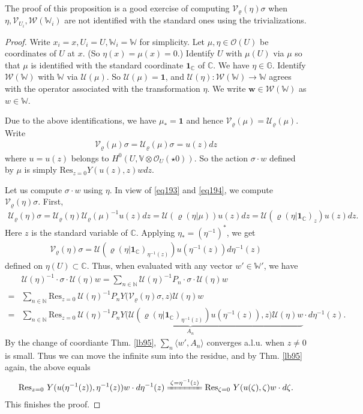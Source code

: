 \documentclass[12pt,a4paper,notitlepage]{article}
\theoremstyle{definition}
\theoremstyle{plain}
\newcommand{\mc}{\mathcal}
\newcommand{\id}{\mathbf{1}}
\newcommand{\Res}{\mathrm{Res}}
\newcommand{\bk}[1]{\langle {#1}\rangle}
\newcommand{\scr}{\mathscr}
\newcommand{\Vbb}{\mathbb V}
\newcommand{\Wbb}{\mathbb W}
\newcommand{\Gbb}{\mathbb G}
\newcommand{\Cbb}{\mathbb C}
\newcommand{\Nbb}{\mathbb N}
\newcommand{\wbf}{\mathbf w}
\numberwithin{equation}{section}
\begin{document}
The proof of this proposition is a good exercise of computing $\mc V_\varrho(\eta)\sigma$ when $\eta,\scr V_{U_i},\scr W(\Wbb_i)$ are not identified with the standard ones using the trivializations.

\begin{proof}
Write $x_i=x,U_i=U,\Wbb_i=\Wbb$ for simplicity. Let $\mu,\eta\in\scr O(U)$ be coordinates of $U$ at $x$. (So $\eta(x)=\mu(x)=0$.) Identify $U$ with $\mu(U)$ via $\mu$ so that $\mu$ is identified with the standard coordinate $\id_\Cbb$ of $\Cbb$. We have $\eta\in\Gbb$. Identify $\scr W(\Wbb)$ with $\Wbb$ via $\mc U(\mu)$. So $\mc U(\mu)=\id$, and $\mc U(\eta):\scr W(\Wbb)\rightarrow\Wbb$ agrees with the operator associated with the transformation $\eta$. We  write $\wbf\in\scr W(\Wbb)$ as $w\in\Wbb$.

Due to the above identifications, we have $\mu_*=\id$ and hence $\mc V_\varrho(\mu)=\mc U_\varrho(\mu)$. Write
\begin{align*}
\mc V_\varrho(\mu)\sigma=\mc U_\varrho(\mu)\sigma=u(z)dz
\end{align*}
where $u=u(z)$ belongs to $H^0(U,\Vbb\otimes\scr O_U(\star 0))$. So the action $\sigma\cdot w$ defined by $\mu$ is simply $\Res_{z=0}Y(u(z),z)wdz$.

Let us compute $\sigma\cdot w$ using $\eta$. In view of \eqref{eq193} and \eqref{eq194}, we compute $\mc V_\varrho(\eta)\sigma$. First,
\begin{align*}
\mc U_\varrho(\eta)\sigma=\mc U_\varrho(\eta)\mc U_\varrho(\mu)^{-1}u(z)dz=\mc U(\varrho(\eta|\mu))u(z)dz=\mc U(\varrho(\eta|\id_\Cbb)_z)u(z)dz.
\end{align*}
Here $z$ is the standard variable of $\Cbb$. Applying $\eta_*=(\eta^{-1})^*$, we get
\begin{align*}
\mc V_\varrho(\eta)\sigma=\mc U(\varrho(\eta|\id_\Cbb)_{\eta^{-1}(z)})u(\eta^{-1}(z))d{\eta^{-1}(z)}
\end{align*}
defined on $\eta(U)\subset\Cbb$. Thus, when evaluated with any vector  $w'\in\Wbb'$, we have
\begin{align*}
&\mc U(\eta)^{-1}\cdot \sigma\cdot \mc U(\eta)w=\sum_{n\in\Nbb}\mc U(\eta)^{-1}P_n\cdot \sigma\cdot \mc U(\eta)w\\
=&\sum_{n\in\Nbb}\Res_{z=0}~\mc U(\eta)^{-1}P_n Y\big(\mc V_\varrho(\eta)\sigma,z\big)\mc U(\eta) w\\
=&\sum_{n\in\Nbb}\Res_{z=0}~\underbrace {\mc U(\eta)^{-1}P_n Y\big(\mc U(\varrho(\eta|\id_\Cbb)_{\eta^{-1}(z)})u(\eta^{-1}(z)),z\big)\mc U(\eta) w}_{A_n}\cdot d{\eta^{-1}(z)}.
\end{align*}
By the change of coordiante Thm. \ref{lb95}, $\sum_n\bk{w',A_n}$ converges a.l.u. when $z\neq 0$ is small. Thus we can move the infinite sum into the residue, and by Thm. \ref{lb95} again, the above equals
\begin{align*}
\Res_{z=0}~Y(u(\eta^{-1}(z)),\eta^{-1}(z))w\cdot d\eta^{-1}(z)
\xlongequal{\zeta=\eta^{-1}(z)}\Res_{\zeta=0}~Y(u(\zeta),\zeta)w\cdot d\zeta.
\end{align*}
This finishes the proof.
\end{proof}
\end{document}

